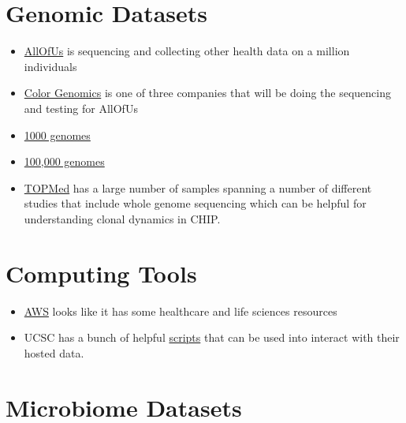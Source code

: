 \documentclass[]{book}
\providecommand{\tightlist}{%
  \setlength{\itemsep}{0pt}\setlength{\parskip}{0pt}}
\begin{document}
\hypertarget{genomic-datasets}{%
\section{Genomic Datasets}\label{genomic-datasets}}

\begin{itemize}
\tightlist
\item
  \href{ttps://www.joinallofus.org/en/how-to-join}{AllOfUs} is sequencing and collecting other health data on a million individuals
\item
  \href{https://www.color.com/}{Color Genomics} is one of three companies that will be doing the sequencing and testing for AllOfUs
\item
  \href{http://www.internationalgenome.org/data/}{1000 genomes}
\item
  \href{https://www.genomicsengland.co.uk/}{100,000 genomes}
\item
  \href{https://www.nhlbiwgs.org/\#Whole\%20Genome\%20Sequencing}{TOPMed} has a large number of samples spanning a number of different studies that include whole genome sequencing which can be helpful for understanding clonal dynamics in CHIP.
\end{itemize}

\hypertarget{computing-tools}{%
\section{Computing Tools}\label{computing-tools}}

\begin{itemize}
\tightlist
\item
  \href{https://aws.amazon.com/health/}{AWS} looks like it has some healthcare and life sciences resources
\item
  UCSC has a bunch of helpful \href{'http://hgdownload.cse.ucsc.edu/admin/exe/linux.x86_64/'}{scripts} that can be used into interact with their hosted data.
\end{itemize}

\hypertarget{microbiome-datasets}{%
\section{Microbiome Datasets}\label{microbiome-datasets}}
\end{document}
